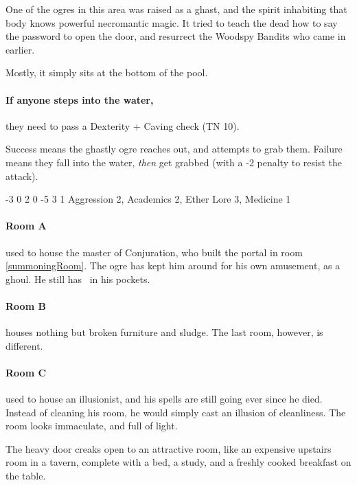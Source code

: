 \begin{multicols}{2}
One of the ogres in this area was raised as a ghast, and the spirit inhabiting that body knows powerful necromantic magic.
It tried to teach the dead how to say the password to open the door, and resurrect the Woodspy Bandits who came in earlier.

Mostly, it simply sits at the bottom of the pool.

\paragraph{If anyone steps into the water,}
they need to pass a Dexterity + Caving check (TN 10).

Success means the ghastly ogre reaches out, and attempts to grab them.
Failure means they fall into the water, \emph{then} get grabbed (with a -2 penalty to resist the attack).

\label{undead_ogre}

  {-3}%
  {0}%
  {{2}%
  {0}%
  {-5}}%
  {3}%
  {1}%
  {Aggression 2, Academics 2, Ether Lore 3, Medicine 1
  \knacks{\nuraCaster}
  }%
  {\longsword}%
  {\addtocounter{xpbonus}{3}}

\paragraph{Room A} used to house the master of Conjuration, who built the portal in room \ref{summoningRoom}.
The ogre has kept him around for his own amusement, as a ghoul.
He still has \lootBig\ in his pockets.

\paragraph{Room B} houses nothing but broken furniture and sludge.
The last room, however, is different.

\paragraph{Room C} used to house an illusionist, and his spells are still going ever since he died.
Instead of cleaning his room, he would simply cast an illusion of cleanliness.
The room looks immaculate, and full of light.

\begin{boxtext}
  The heavy door creaks open to an attractive room, like an expensive upstairs room in a tavern, complete with a bed, a study, and a freshly cooked breakfast on the table.
\end{boxtext}


\end{multicols}
